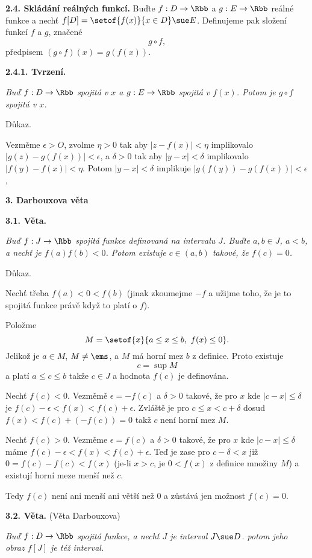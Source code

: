 \documentclass[12pt]{article}
\begin{document}
{ \bigskip
 
 {\bf 2.4. Skládání reálných funkcí.} Buďte $f:D\to\Rbb$ a $g:E\to\Rbb$ reálné funkce a nechť $f[D]=\setof{f(x)}{x\in D}\sue E$. Definujeme pak složení funkcí $f$ a $g$, značené
 $$
 g\circ f,
 $$
 předpisem $(g\circ f)(x)= g(f(x))$.
 
 \medskip
 
 {\bf 2.4.1. Tvrzení.} {\em Buď $f:D\to\Rbb$ spojitá v $x$ a $g:E\to\Rbb$ spojitá v $f(x)$. Potom je $g\circ f$ spojitá v $x$.
 
 Důkaz.} Vezměme $\epsilon> O$, zvolme  $\eta>0$ tak aby $|z-f(x)|<\eta$ implikovalo
 $|g(z)-g(f(x))|<\epsilon$, a $\delta>0$ tak aby $|y-x|<\delta$ implikovalo
 $|f(y)-f(x)|<\eta$. Potom $|y-x|<\delta$ implikuje
 $|g(f(y))-g(f(x))|<\epsilon$, \sq
 
 
 


\vskip10mm
 
 {\large\bf 3.  Darbouxova věta}
 
 \bigskip
 
 {\bf 3.1. Věta.} {\em Buď $f:J\to \Rbb$ spojitá funkce definovaná na intervalu $J$. Buďte $a,b\in J$, $a<b$, a nechť je $f(a)f(b)<0$. Potom existuje $c\in (a,b)$ takové, že $f(c)=0$.
 
 Důkaz.} Nechť třeba $f(a)<0<f(b)$ (jinak zkoumejme $-f$ a užijme toho, že je to spojitá funkce právě když to platí o $f$).
 
 Položme
 $$
 M=\setof{x}{a\leq x\leq b,\ f(x)\leq 0}.
 $$
 Jelikož je $a\in M$, $M\neq \ems$, a $M$ má horní mez $b$ z definice. Proto existuje
 $$
 c=\sup M
 $$
 a platí $a\leq c\leq b$ takže $c\in J$ a hodnota $f(c)$ je definována.
 
 Nechť $f(c)<0$.  Vezměmě $\epsilon=-f(c)$ a $\delta >0$ takové, že pro
 $x$ kde $|c-x|\leq \delta$ je $f(c)-\epsilon<f(x)<f(c)+\epsilon$. Zvláště je pro $c\leq x<c+\delta$ dosud $f(x)<f(c)+(-f(c))=0$ takž $c$ není horní mez $M$.
 
 Nechť $f(c)>0$. Vezměme $\epsilon=f(c)$  a $\delta >0$ takové, že pro
 $x$ kde $|c-x|\leq \delta$ máme $f(c)-\epsilon<f(x)<f(c)+\epsilon$.
 Teď je zase pro $c-\delta< x$ již $0=f(c)-f(c)<f(x)$ (je-li $x>c$, je $0<f(x)$ z definice množiny $M$) a
existují horní meze menší než  $c$.
 
 Tedy $f(c)$ není ani menší ani větší než 0 a zůstává jen možnost $f(c)=0$.\sq
 
 \bigskip
 
 {\bf 3.2. Věta.} (Věta Darbouxova) {\em Buď $f:D\to\Rbb$ spojitá funkce, a nechť $J$ je interval $J\sue D$. potom jeho obraz $f[J]$ je též interval.
 
}}
\end{document}
